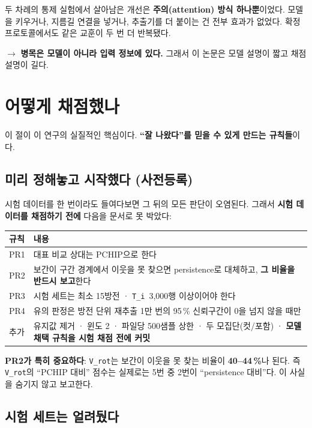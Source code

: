 \documentclass[10pt]{article}
\newcommand{\Ti}{\texttt{T\_i}}
\newcommand{\Vrot}{\texttt{V\_rot}}
\begin{document}
두 차례의 통제 실험에서 살아남은 개선은 \textbf{주의(attention) 방식 하나뿐}이었다. 모델을
키우거나, 지름길 연결을 넣거나, 추출기를 더 붙이는 건 전부 효과가 없었다. 확정 프로토콜에서도
같은 교훈이 두 번 더 반복됐다.

$\rightarrow$ \textbf{병목은 모델이 아니라 입력 정보에 있다.} 그래서 이 논문은 모델 설명이
짧고 채점 설명이 길다.

\section{어떻게 채점했나}

이 절이 이 연구의 실질적인 핵심이다. \textbf{``잘 나왔다''를 믿을 수 있게 만드는 규칙들}이다.

\subsection{미리 정해놓고 시작했다 (사전등록)}

시험 데이터를 한 번이라도 들여다보면 그 뒤의 모든 판단이 오염된다. 그래서 \textbf{시험
데이터를 채점하기 전에} 다음을 문서로 못 박았다:

\begin{center}
\begin{tabularx}{\textwidth}{@{}l L@{}}
\toprule
\textbf{규칙} & \textbf{내용} \\
\midrule
PR1 & 대표 비교 상대는 PCHIP으로 한다 \\
PR2 & 보간이 구간 경계에서 이웃을 못 찾으면 persistence로 대체하고,
  \textbf{그 비율을 반드시 보고}한다 \\
PR3 & 시험 세트는 최소 15방전 · \Ti\ 3{,}000행 이상이어야 한다 \\
PR4 & 유의 판정은 방전 단위 재추출 1만 번의 95\,\% 신뢰구간이 0을 넘지 않을 때만 \\
추가 & 유지값 제거 · 윈도 2 · 파일당 500샘플 상한 · 두 모집단(컷/포함) ·
  \textbf{모델 채택 규칙을 시험 채점 전에 커밋} \\
\bottomrule
\end{tabularx}
\end{center}

\textbf{PR2가 특히 중요하다}: \Vrot 는 보간이 이웃을 못 찾는 비율이 \textbf{40--44\,\%}나
된다. 즉 \Vrot 의 ``PCHIP 대비'' 점수는 실제로는 5번 중 2번이 ``persistence 대비''다.
이 사실을 숨기지 않고 보고한다.

\subsection{시험 세트는 얼려뒀다}
\end{document}
